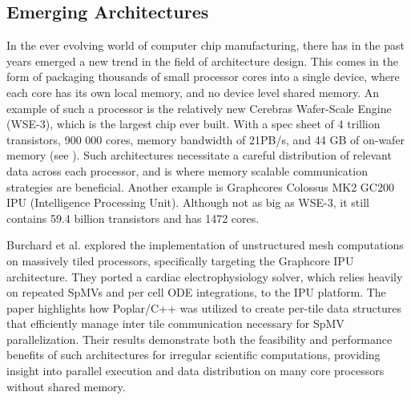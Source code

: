 \subsection{Emerging Architectures}
In the ever evolving world of computer chip manufacturing, there has in the past years emerged a new trend in the field of architecture design. This comes in the form of packaging thousands of small processor cores into a single device, where each core has its own local memory, and no device level shared memory. An example of such a processor is the relatively new Cerebras Wafer-Scale Engine (WSE-3), which is the largest chip ever built. With a spec sheet of 4 trillion transistors, 900 000 cores, memory bandwidth of 21PB/s, and 44 GB of on-wafer memory (see \cite{cerebras2024wse3}). Such architectures necessitate a careful distribution of relevant data across each processor, and is where memory scalable communication strategies are beneficial. Another example is Graphcores Colossus MK2 GC200 IPU (Intelligence Processing Unit). Although not as big as WSE-3, it still contains 59.4 billion transistors and has 1472 cores.
\medskip

Burchard et al. \cite{10.3389/fphy.2023.979699} explored the implementation of unstructured mesh computations on massively tiled processors, specifically targeting the Graphcore IPU architecture. They ported a cardiac electrophysiology solver, which relies heavily on repeated SpMVs and per cell ODE integrations, to the IPU platform. The paper highlights how Poplar/C++ was utilized to create per-tile data structures that efficiently manage inter tile communication necessary for SpMV parallelization. Their results demonstrate both the feasibility and performance benefits of such architectures for irregular scientific computations, providing insight into parallel execution and data distribution on many core processors without shared memory.

